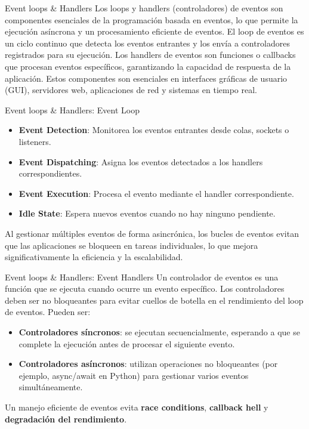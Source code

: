 \documentclass[11pt]{beamer}
\begin{document}
	
	\begin{frame}{Event loops \& Handlers}
	\small \justifying
	Los loops y handlers (controladores) de eventos son componentes esenciales de la programación basada en eventos, lo que permite la ejecución asíncrona y un procesamiento eficiente de eventos. El loop de eventos es un ciclo continuo que detecta los eventos entrantes y los envía a controladores registrados para su ejecución. Los handlers de eventos son funciones o callbacks que procesan eventos específicos, garantizando la capacidad de respuesta de la aplicación. Estos componentes son esenciales en interfaces gráficas de usuario (GUI), servidores web, aplicaciones de red y sistemas en tiempo real.
	\end{frame}

	\begin{frame}{Event loops \& Handlers: Event Loop}
	\small
	\begin{itemize}
		\item \textbf{Event Detection}: Monitorea los eventos entrantes desde colas, sockets o listeners.
		\item \textbf{Event Dispatching}: Asigna los eventos detectados a los handlers correspondientes.
		\item \textbf{Event Execution}: Procesa el evento mediante el handler correspondiente.
		\item \textbf{Idle State}: Espera nuevos eventos cuando no hay ninguno pendiente.
	\end{itemize} 
	\vspace{1cm}
	Al gestionar múltiples eventos de forma asincrónica, los bucles de eventos evitan que las aplicaciones se bloqueen en tareas individuales, lo que mejora significativamente la eficiencia y la escalabilidad.
	\end{frame}
	
	\begin{frame}{Event loops \& Handlers: Event Handlers}
	\small
	Un controlador de eventos es una función que se ejecuta cuando ocurre un evento específico. Los controladores deben ser no bloqueantes para evitar cuellos de botella en el rendimiento del loop de eventos. Pueden ser:
	\begin{itemize}
		\item \textbf{Controladores síncronos}: se ejecutan secuencialmente, esperando a que se complete la ejecución antes de procesar el siguiente evento.
		\item \textbf{Controladores asíncronos}: utilizan operaciones no bloqueantes (por ejemplo, async/await en Python) para gestionar varios eventos simultáneamente.
	\end{itemize} 
	\vspace{1cm}
	Un manejo eficiente de eventos evita \textbf{race conditions}, \textbf{callback hell} y \textbf{degradación del rendimiento}.
	\end{frame}
\end{document}
